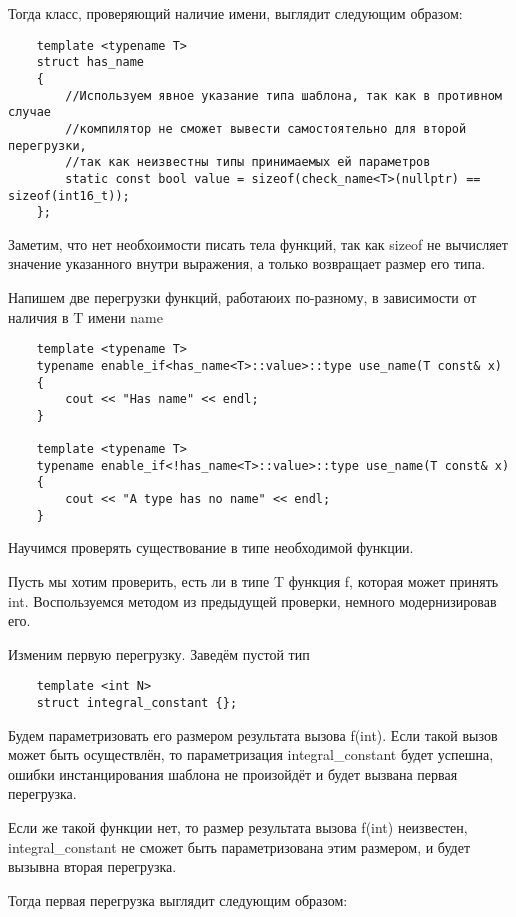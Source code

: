 	Тогда класс, проверяющий наличие имени, выглядит следующим образом:

	\begin{verbatim}
	template <typename T>
	struct has_name
	{
	    //Используем явное указание типа шаблона, так как в противном случае
	    //компилятор не сможет вывести самостоятельно для второй перегрузки,
	    //так как неизвестны типы принимаемых ей параметров
	    static const bool value = sizeof(check_name<T>(nullptr) == sizeof(int16_t));
	};
	\end{verbatim}

	Заметим, что нет необхоимости писать тела функций, так как sizeof не вычисляет значение указанного внутри выражения, а только возвращает размер его типа.
	
	Напишем две перегрузки функций, работаюих по-разному, в зависимости от наличия в T имени name
	
	\begin{verbatim}
	template <typename T>
	typename enable_if<has_name<T>::value>::type use_name(T const& x)
	{
	    cout << "Has name" << endl;
	}

	template <typename T>
	typename enable_if<!has_name<T>::value>::type use_name(T const& x)
	{
	    cout << "A type has no name" << endl;
	}
	\end{verbatim}
	
	\vspace{\baselineskip}	
	Научимся проверять существование в типе необходимой функции.
	
	Пусть мы хотим проверить, есть ли в типе T функция f, которая может принять int. Воспользуемся методом из предыдущей проверки, немного модернизировав его.

	Изменим первую перегрузку. Заведём пустой тип

	\begin{verbatim}
	template <int N>
	struct integral_constant {};
	\end{verbatim}
	
	Будем параметризовать его размером результата вызова f(int). Если такой вызов может быть осуществлён, то параметризация integral\_constant будет успешна, ошибки инстанцирования шаблона не произойдёт и будет вызвана первая перегрузка.
	
	 Если же такой функции нет, то размер результата вызова f(int) неизвестен, integral\_constant не сможет быть параметризована этим размером, и будет вызывна вторая перегрузка.
	 
	  Тогда первая перегрузка выглядит следующим образом:
	  
